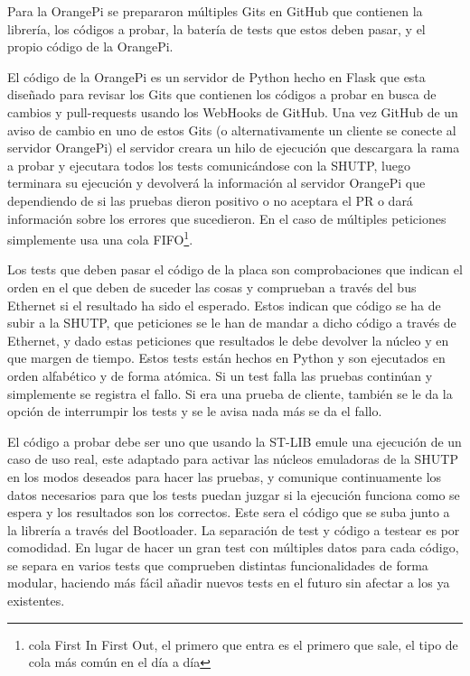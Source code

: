 \documentclass{report}
\begin{document}
Para la OrangePi se prepararon múltiples Gits en GitHub que contienen la librería, los códigos a probar, la batería de tests que estos deben pasar, y el propio código de la OrangePi. \par
El código de la OrangePi es un servidor de Python hecho en Flask que esta diseñado para revisar los Gits que contienen los códigos a probar en busca de cambios y pull-requests usando los WebHooks de GitHub. Una vez GitHub de un aviso de cambio en uno de estos Gits (o alternativamente un cliente se conecte al servidor OrangePi) el servidor creara un hilo de ejecución que descargara la rama a probar y ejecutara todos los tests comunicándose con la SHUTP, luego terminara su ejecución y devolverá la información al servidor OrangePi que dependiendo de si las pruebas dieron positivo o no aceptara el PR o dará información sobre los errores que sucedieron. En el caso de múltiples peticiones simplemente usa una cola FIFO\footnote{cola First In First Out, el primero que entra es el primero que sale, el tipo de cola más común en el día a día}. \par \vspace{0.3cm}
Los tests que deben pasar el código de la placa son comprobaciones que indican el orden en el que deben de suceder las cosas y comprueban a través del bus Ethernet si el resultado ha sido el esperado. Estos indican que código se ha de subir a la SHUTP, que peticiones se le han de mandar a dicho código a través de Ethernet, y dado estas peticiones que resultados le debe devolver la núcleo y en que margen de tiempo. Estos tests están hechos en Python y son ejecutados en orden alfabético y de forma atómica. Si un test falla las pruebas continúan y simplemente se registra el fallo. Si era una prueba de cliente, también se le da la opción de interrumpir los tests y se le avisa nada más se da el fallo. \par
El código a probar debe ser uno que usando la ST-LIB emule una ejecución de un caso de uso real, este adaptado para activar las núcleos emuladoras de la SHUTP en los modos deseados para hacer las pruebas, y comunique continuamente los datos necesarios para que los tests puedan juzgar si la ejecución funciona como se espera y los resultados son los correctos. Este sera el código que se suba junto a la librería a través del Bootloader. La separación de test y código a testear es por comodidad. En lugar de hacer un gran test con múltiples datos para cada código, se separa en varios tests que comprueben distintas funcionalidades de forma modular, haciendo más fácil añadir nuevos tests en el futuro sin afectar a los ya existentes.
\end{document}
